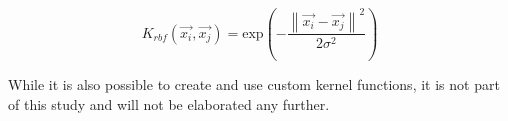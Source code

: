 \begin{equation}
    K_{rbf}(\vec{x_{i}},\vec{x_{j}})=\mathrm{exp}(-\frac{\left\|\vec{x_{i}}-\vec{x_{j}}\right\|^2}{2\sigma^{2}})
    \label{equation:rbf-kernel}
\end{equation}

While it is also possible to create and use custom kernel functions, it is not part of this study and will not be elaborated any further.

